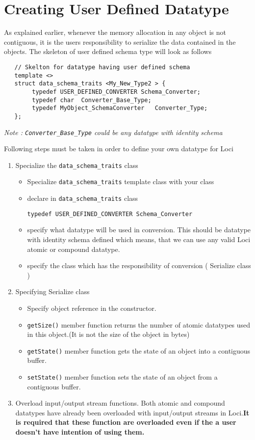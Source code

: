 \section{Creating User Defined Datatype}
\par As explained earlier, whenever the memory allocation in any object is
not contiguous, it is the users responsibility to serialize the
data contained in the objects.  The skeleton of user defined schema type
will look as follows
\begin{verbatim}
   // Skelton for datatype having user defined schema
   template <>
   struct data_schema_traits <My_New_Type2 > {
        typedef USER_DEFINED_CONVERTER Schema_Converter;
        typedef char  Converter_Base_Type;
        typedef MyObject_SchemaConverter   Converter_Type;
   };
\end{verbatim}
\par {\em Note : {\tt Converter\_Base\_Type} could be any datatype with identity schema}
\par Following steps must be taken in order to define your own datatype
for Loci
\begin{enumerate} 
\item Specialize the {\tt data\_schema\_traits} class
\begin{itemize}
\item Specialize {\tt data\_schema\_traits} template class with your
class
\item \par declare in {\tt data\_schema\_traits} class
\begin{center}
{\tt typedef USER\_DEFINED\_CONVERTER Schema\_Converter}
\end{center}
\item specify what datatype will be used in conversion. This should be 
datatype with identity schema defined which means, that we can use any 
valid Loci atomic or compound datatype.
\item specify the class which has the responsibility of conversion (
Serialize class )
\end{itemize}
\item Specifying Serialize class
\begin{itemize}
\item Specify object reference in the constructor.
\item {\tt getSize()} member function returns the number of atomic
  datatypes used in this object.(It is not the size of the object in
  bytes)
\item {\tt getState()} member function gets the state of an
object into a contiguous buffer.
\item {\tt setState()} member function sets the state of an
object from a contiguous buffer.
\end{itemize}
\item Overload input/output stream functions.
Both atomic and compound datatypes have already been overloaded with
input/output streams in Loci.{\bf It is required that these function 
are overloaded even if the a user doesn't have intention of
using them.}
\end{enumerate}
